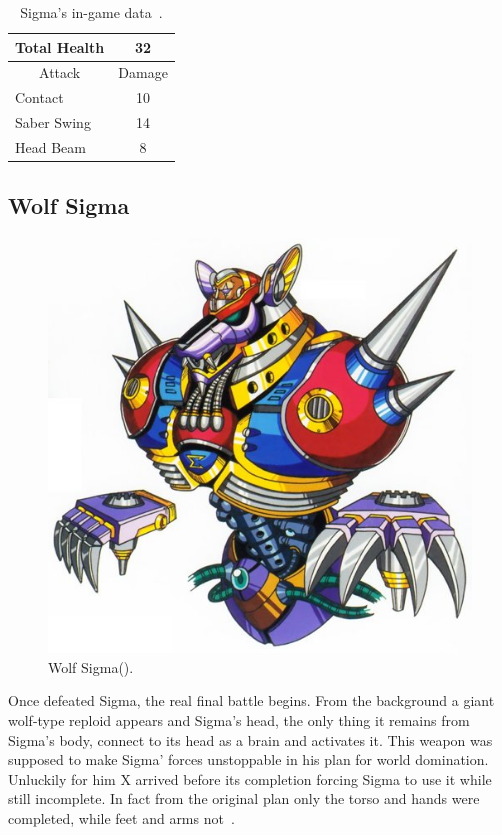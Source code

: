 \begin{table}
	\centering
	\begin{tabular}[h]{l c}
		\toprule
		Total Health  & 32\\
		\midrule
		\multicolumn{1}{c}{Attack} & \multicolumn{1}{c}{Damage}\\
		Contact & 10\\
		Saber Swing & 14\\
		Head Beam& 8\\
		\bottomrule
	\end{tabular}
	\caption{Sigma's in-game data~\cite{wiki:Sigma}.}
\end{table}

\subsection{Wolf Sigma}\label{boss:wolf_sigma}
\begin{figure}[htp]
	\centering
	\includegraphics[width=0.4\linewidth]{figures/X1/Sigma_stages/WolfSigma.jpg}
	\caption{Wolf Sigma(\cite{book:MMX_Complete_art}).}
\end{figure}
Once defeated Sigma, the real final battle begins. From the background a giant wolf-type reploid appears and Sigma's head, the only thing it remains from Sigma's body, connect to its head as a brain and activates it. This weapon was supposed to make Sigma' forces unstoppable in his plan for world domination. Unluckily for him X arrived before its completion forcing Sigma to use it while still incomplete. In fact from the original plan only the torso and hands were completed, while feet and arms not~\cite{wayback:X_resources}.

